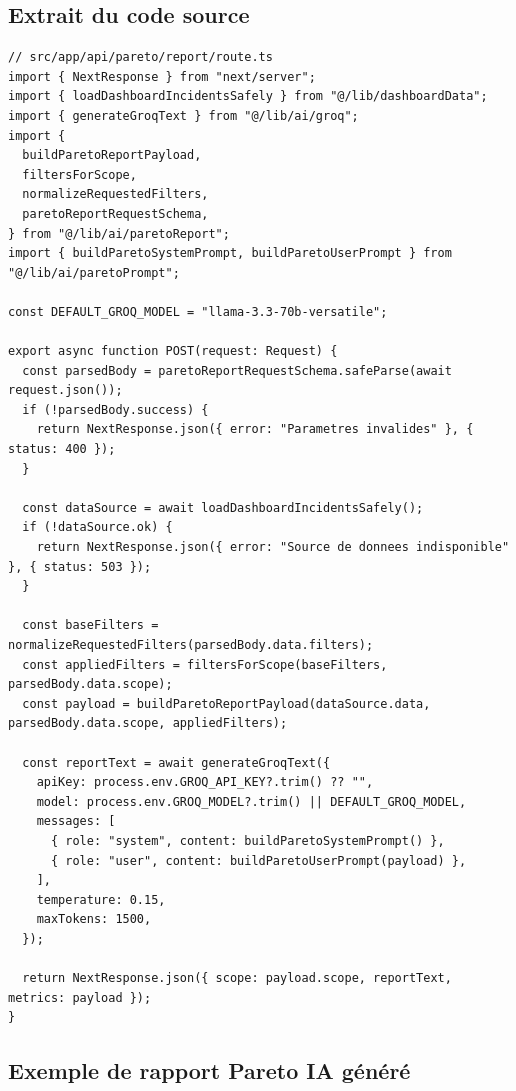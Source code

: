 \documentclass[10pt,a4paper]{report}
\begin{document}
\subsection{Extrait du code source}

\begin{lstlisting}[style=jsStyle, caption={Route Handler Next.js --- Module Pareto Intelligent (Groq / Llama 3.3 70B)}, label={lst:pareto-api}]
// src/app/api/pareto/report/route.ts
import { NextResponse } from "next/server";
import { loadDashboardIncidentsSafely } from "@/lib/dashboardData";
import { generateGroqText } from "@/lib/ai/groq";
import {
  buildParetoReportPayload,
  filtersForScope,
  normalizeRequestedFilters,
  paretoReportRequestSchema,
} from "@/lib/ai/paretoReport";
import { buildParetoSystemPrompt, buildParetoUserPrompt } from "@/lib/ai/paretoPrompt";

const DEFAULT_GROQ_MODEL = "llama-3.3-70b-versatile";

export async function POST(request: Request) {
  const parsedBody = paretoReportRequestSchema.safeParse(await request.json());
  if (!parsedBody.success) {
    return NextResponse.json({ error: "Parametres invalides" }, { status: 400 });
  }

  const dataSource = await loadDashboardIncidentsSafely();
  if (!dataSource.ok) {
    return NextResponse.json({ error: "Source de donnees indisponible" }, { status: 503 });
  }

  const baseFilters = normalizeRequestedFilters(parsedBody.data.filters);
  const appliedFilters = filtersForScope(baseFilters, parsedBody.data.scope);
  const payload = buildParetoReportPayload(dataSource.data, parsedBody.data.scope, appliedFilters);

  const reportText = await generateGroqText({
    apiKey: process.env.GROQ_API_KEY?.trim() ?? "",
    model: process.env.GROQ_MODEL?.trim() || DEFAULT_GROQ_MODEL,
    messages: [
      { role: "system", content: buildParetoSystemPrompt() },
      { role: "user", content: buildParetoUserPrompt(payload) },
    ],
    temperature: 0.15,
    maxTokens: 1500,
  });

  return NextResponse.json({ scope: payload.scope, reportText, metrics: payload });
}
\end{lstlisting}

\subsection{Exemple de rapport Pareto IA généré}
\end{document}
